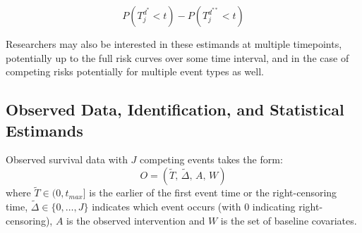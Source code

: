 \documentclass{report}
\newcommand{\1}{\ensuremath{\mathbf{1}}}
\newcommand{\T}{\ensuremath{\widetilde{T}}}
\renewcommand{\L}{\ensuremath{W}}
\newcommand{\tDelta}{\ensuremath{\widetilde{\Delta}}}
\begin{document}
\begin{equation}
P(T^{d^*}_j < t) - P(T^{d^{**}}_j < t) \label{causalsurv}
\end{equation}

Researchers may also be interested in these estimands at multiple timepoints, potentially up to the full risk curves over some time interval, and in the case of competing risks potentially for multiple event types as well.

\subsection{Observed Data, Identification, and Statistical Estimands}
\label{ObservedData}
Observed survival data with \(J\) competing events takes the form:
\begin{equation}
 O = \left(\T,\, \tDelta,\, A,\, \L \right) \label{obs-data}
\end{equation}
where \(\T \in (0, t_{max}]\) is the earlier of the first event time or the right-censoring time, \(\tDelta \in \{0, \dots, J\}\) indicates which event occurs (with 0 indicating right-censoring), \(A\) is the observed intervention and \(\L\) is the set of baseline covariates.
\end{document}
